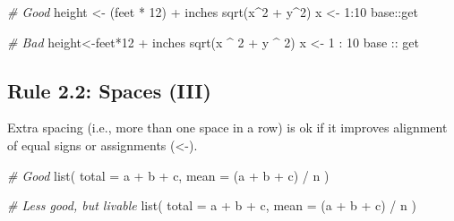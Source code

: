 \documentclass[
  letterpaper,
  DIV=11,
  numbers=noendperiod]{scrreprt}
\newenvironment{Shaded}{\begin{snugshade}}{\end{snugshade}}
\newcommand{\AttributeTok}[1]{\textcolor[rgb]{0.49,0.56,0.16}{#1}}
\newcommand{\CommentTok}[1]{\textcolor[rgb]{0.38,0.63,0.69}{\textit{#1}}}
\newcommand{\DecValTok}[1]{\textcolor[rgb]{0.25,0.63,0.44}{#1}}
\newcommand{\FunctionTok}[1]{\textcolor[rgb]{0.02,0.16,0.49}{#1}}
\newcommand{\NormalTok}[1]{\textcolor[rgb]{0.00,0.44,0.13}{#1}}
\newcommand{\OtherTok}[1]{\textcolor[rgb]{0.00,0.44,0.13}{#1}}
\newcommand{\SpecialCharTok}[1]{\textcolor[rgb]{0.25,0.44,0.63}{#1}}
\begin{document}
\begin{Shaded}
\begin{Highlighting}[]
\CommentTok{\# Good}
\NormalTok{height }\OtherTok{\textless{}{-}}\NormalTok{ (feet }\SpecialCharTok{*} \DecValTok{12}\NormalTok{) }\SpecialCharTok{+}\NormalTok{ inches}
\FunctionTok{sqrt}\NormalTok{(x}\SpecialCharTok{\^{}}\DecValTok{2} \SpecialCharTok{+}\NormalTok{ y}\SpecialCharTok{\^{}}\DecValTok{2}\NormalTok{)}
\NormalTok{x }\OtherTok{\textless{}{-}} \DecValTok{1}\SpecialCharTok{:}\DecValTok{10}
\NormalTok{base}\SpecialCharTok{::}\NormalTok{get}

\CommentTok{\# Bad}
\NormalTok{height}\OtherTok{\textless{}{-}}\NormalTok{feet}\SpecialCharTok{*}\DecValTok{12} \SpecialCharTok{+}\NormalTok{ inches}
\FunctionTok{sqrt}\NormalTok{(x }\SpecialCharTok{\^{}} \DecValTok{2} \SpecialCharTok{+}\NormalTok{ y }\SpecialCharTok{\^{}} \DecValTok{2}\NormalTok{)}
\NormalTok{x }\OtherTok{\textless{}{-}} \DecValTok{1} \SpecialCharTok{:} \DecValTok{10}
\NormalTok{base }\SpecialCharTok{::}\NormalTok{ get}
\end{Highlighting}
\end{Shaded}

\hypertarget{rule-2.2-spaces-iii}{%
\subsection{Rule 2.2: Spaces (III)}\label{rule-2.2-spaces-iii}}

Extra spacing (i.e., more than one space in a row) is ok if it improves
alignment of equal signs or assignments (\textless-).

\begin{Shaded}
\begin{Highlighting}[]
\CommentTok{\# Good}
\FunctionTok{list}\NormalTok{(}
  \AttributeTok{total =}\NormalTok{ a }\SpecialCharTok{+}\NormalTok{ b }\SpecialCharTok{+}\NormalTok{ c,}
  \AttributeTok{mean  =}\NormalTok{ (a }\SpecialCharTok{+}\NormalTok{ b }\SpecialCharTok{+}\NormalTok{ c) }\SpecialCharTok{/}\NormalTok{ n}
\NormalTok{)}

\CommentTok{\# Less good, but livable}
\FunctionTok{list}\NormalTok{(}
  \AttributeTok{total =}\NormalTok{ a }\SpecialCharTok{+}\NormalTok{ b }\SpecialCharTok{+}\NormalTok{ c,}
  \AttributeTok{mean =}\NormalTok{ (a }\SpecialCharTok{+}\NormalTok{ b }\SpecialCharTok{+}\NormalTok{ c) }\SpecialCharTok{/}\NormalTok{ n}
\NormalTok{)}
\end{Highlighting}
\end{Shaded}
\end{document}
